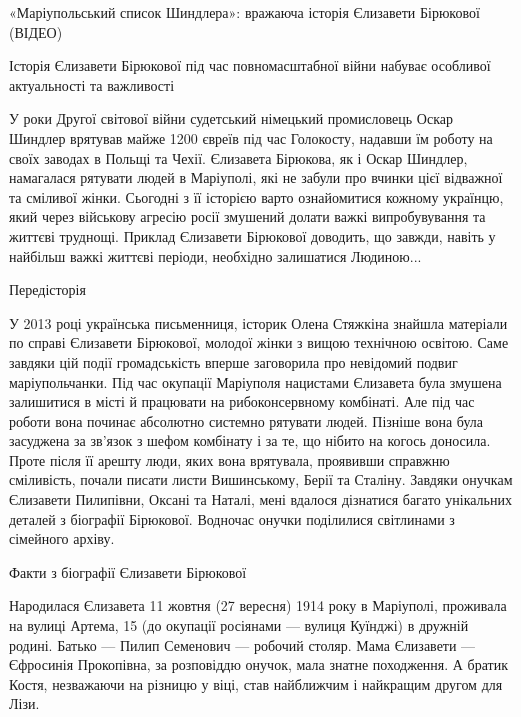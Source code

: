  
 
 
 
 

«Маріупольський список Шиндлера»: вражаюча історія Єлизавети Бірюкової (ВІДЕО)

Історія Єлизавети Бірюкової під час повномасштабної війни набуває особливої актуальності та важливості

У роки Другої світової війни судетський німецький промисловець Оскар Шиндлер
врятував майже 1200 євреїв під час Голокосту, надавши їм роботу на своїх
заводах в Польщі та Чехії. Єлизавета Бірюкова, як і Оскар Шиндлер, намагалася
рятувати людей в Маріуполі, які не забули про вчинки цієї відважної та сміливої
жінки. Сьогодні з її історією варто ознайомитися кожному українцю, який через
військову агресію росії змушений долати важкі випробувування та життєві
труднощі. Приклад Єлизавети Бірюкової доводить, що завжди, навіть у найбільш
важкі життєві періоди, необхідно залишатися Людиною... 

Передісторія

У 2013 році українська письменниця, історик Олена Стяжкіна знайшла матеріали по
справі Єлизавети Бірюкової, молодої жінки з вищою технічною освітою. Саме
завдяки цій події громадськість вперше заговорила про невідомий подвиг
маріупольчанки. Під час окупації Маріуполя нацистами Єлизавета була змушена
залишитися в місті й працювати на рибоконсервному комбінаті. Але під час роботи
вона починає абсолютно системно рятувати людей. Пізніше вона була засуджена за
зв'язок з шефом комбінату і за те, що нібито на когось доносила. Проте після її
арешту люди, яких вона врятувала, проявивши справжню сміливість, почали писати
листи Вишинському, Берії та Сталіну. Завдяки онучкам Єлизавети Пилипівни,
Оксані та Наталі, мені вдалося дізнатися багато унікальних деталей з біографії
Бірюкової. Водночас онучки поділилися світлинами з сімейного архіву.

Факти з біографії Єлизавети Бірюкової

Народилася Єлизавета 11 жовтня (27 вересня) 1914 року в Маріуполі, проживала на
вулиці Артема, 15 (до окупації росіянами — вулиця Куїнджі) в дружній родині.
Батько — Пилип Семенович — робочий столяр. Мама Єлизавети — Єфросинія
Прокопівна, за розповіддю онучок, мала знатне походження. А братик Костя,
незважаючи на різницю у віці, став найближчим і найкращим другом для Лізи.

